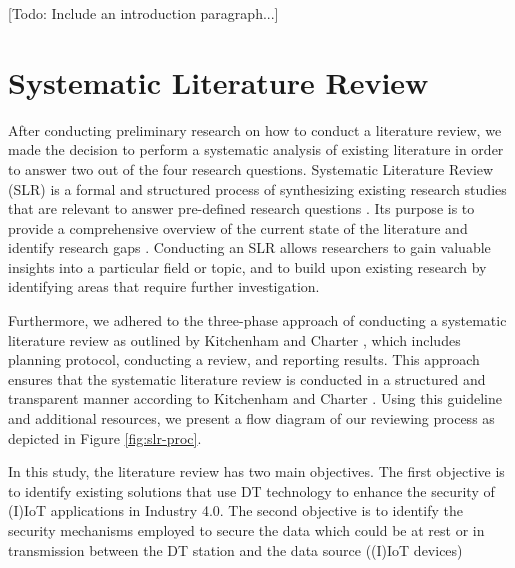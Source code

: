 
[Todo: Include an introduction paragraph...]

\section{Systematic Literature Review}
After conducting preliminary research on how to conduct a literature review, we made the decision to perform a systematic analysis of existing literature in order to answer two out of the four research questions. Systematic Literature Review (SLR) is a formal and structured process of synthesizing existing research studies that are relevant to answer pre-defined research questions \cite{kitchenham_guidelines_2007}. Its purpose is to provide a comprehensive overview of the current state of the literature and identify research gaps \cite{carrera-rivera_how-conduct_2022}. Conducting an SLR allows researchers to gain valuable insights into a particular field or topic, and to build upon existing research by identifying areas that require further investigation.

Furthermore, we adhered to the three-phase approach of conducting a systematic literature review as outlined by Kitchenham and Charter \cite{kitchenham_guidelines_2007}, which includes planning protocol, conducting a review, and reporting results. This approach ensures that the systematic literature review is conducted in a structured and transparent manner according to Kitchenham and Charter \cite{kitchenham_guidelines_2007}. Using this guideline and additional resources, we present a flow diagram of our reviewing process as depicted in Figure \ref{fig:slr-proc}. 

In this study, the literature review has two main objectives. The first objective is to identify existing solutions that use DT technology to enhance the security of (I)IoT applications in Industry 4.0. The second objective is to identify the security mechanisms employed to secure the data which could be at rest or in transmission between the DT station and the data source ((I)IoT devices)



